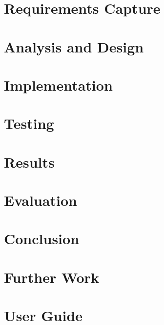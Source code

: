 \documentclass[12pt]{article}
\begin{document}
\section{Requirements Capture}
  
\section{Analysis and Design}
  
\section{Implementation}
\section{Testing}
\section{Results}
\section{Evaluation}
\section{Conclusion}
\section{Further Work}
\section{User Guide}

\newpage
\appendix

% 


\end{document}
